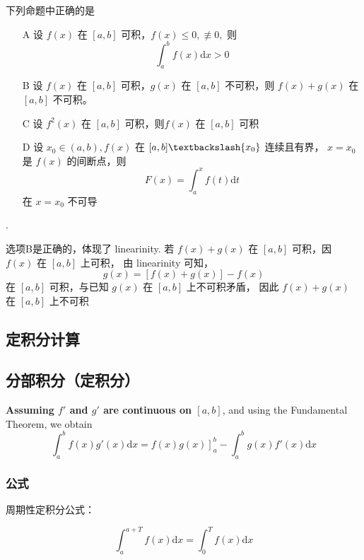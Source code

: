 \begin{example}
    下列命题中正确的是
    \begin{itemize}
        \item[A] 设 $f(x)$ 在 $[a, b]$ 可积，$f(x) \leq 0, \nequiv 0, $ 则
            \[
                \int_a^b f(x) \mathrm dx > 0
            \]
        \item[B] 设 $f(x)$ 在 $[a, b]$ 可积，$g(x)$ 在 $[a, b]$ 不可积，则 $f(x) + g(x)$ 在 $[a, b]$ 不可积。
        \item[C] 设 $f^2(x)$ 在 $[a, b]$ 可积，则$f(x)$ 在 $[a, b]$ 可积
        \item[D] 设 $x_0 \in (a, b), f(x)$ 在 $[a, b]\textbackslash \{x_0\}$ 连续且有界，
            $x = x_0$ 是 $f(x)$ 的间断点，则
            \[
                F(x) = \int_a^x f(t) \mathrm dt
            \]
            在 $x = x_0$ 不可导
    \end{itemize}

    \cite[question 181]{w660}.

    选项B是正确的，体现了 linearinity.
    若 $f(x) + g(x)$ 在 $[a, b]$ 可积，因 $f(x)$ 在 $[a, b]$ 上可积，
    由 linearinity 可知，
    \[
        g(x) = [f(x) + g(x)] - f(x)
    \]
    在 $[a, b]$ 可积，与已知 $g(x)$ 在 $[a, b]$ 上不可积矛盾，
    因此 $f(x) + g(x)$ 在 $[a, b]$ 上不可积
\end{example}

\subsection{定积分计算}

\subsection{分部积分（定积分）}
\label{definite-integration-by-parts}

\begin{definition}
    \textbf{Assuming $f'$ and $g'$ are continuous on $[a, b]$}, 
    and using the Fundamental Theorem, we obtain
    \[
        \int_a^b f(x) g'(x) \mathrm dx = \left. f(x)g(x) \right]_a^b - \int_a^b g(x)f'(x) \mathrm dx
    \]
\end{definition}

\subsubsection{公式}

周期性定积分公式：
\begin{lemma}
    \begin{equation}
        \int_a^{a + T} f(x) \mathrm{d} x = \int_0^T f(x) \mathrm{d} x
    \end{equation}
\end{lemma}

